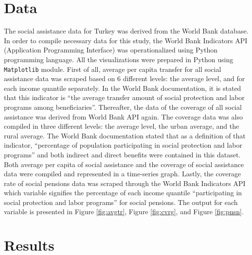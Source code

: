 \documentclass[11pt]{article}
\begin{document}
\section{Data}

\noindent The social assistance data for Turkey was derived from the World Bank database. In order to compile necessary data for this study, the World Bank Indicators API (Application Programming Interface) was operationalized using Python programming language. All the visualizations were prepared in Python using \verb|Matplotlib| module. First of all, average per capita transfer for all social assistance data was scraped based on 6 different levels: the average level, and for each income quantile separately. In the World Bank documentation, it is stated that this indicator is “the average transfer amount of social protection and labor programs among beneficiaries”. Thereafter, the data of the coverage of all social assistance was derived from World Bank API again. The coverage data was also compiled in three different levels: the average level, the urban average, and the rural average. The World Bank documentation stated that as a definition of that indicator, “percentage of population participating in social protection and labor programs” and both indirect and direct benefits were contained in this dataset. Both average per capita of social assistance and the coverage of social assistance data were compiled and represented in a time-series graph. Lastly, the coverage rate of social pensions data was scraped through the World Bank Indicators API which variable signifies the percentage of each income quantile “participating in social protection and labor programs” for social pensions. The output for each variable is presented in Figure \ref{fig:avgtr}, Figure \ref{fig:cvrg}, and Figure \ref{fig:pnsn}.

\section{Results}
\end{document}
